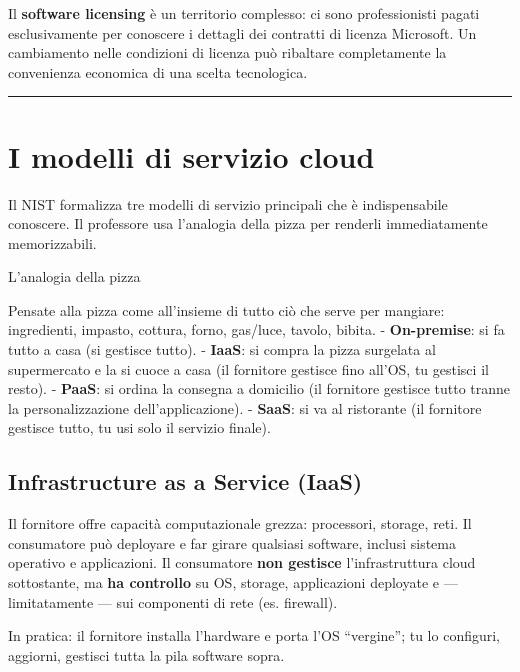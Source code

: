 \documentclass[
  italian,
  openany]{book}
\begin{document}
Il \textbf{software licensing} è un territorio complesso: ci sono
professionisti pagati esclusivamente per conoscere i dettagli dei
contratti di licenza Microsoft. Un cambiamento nelle condizioni di
licenza può ribaltare completamente la convenienza economica di una
scelta tecnologica.

\begin{center}\rule{0.5\linewidth}{0.5pt}\end{center}

\section{I modelli di servizio cloud}\label{i-modelli-di-servizio-cloud}

Il NIST formalizza tre modelli di servizio principali che è
indispensabile conoscere. Il professore usa l'analogia della pizza per
renderli immediatamente memorizzabili.

\begin{callouttip}{L’analogia della pizza}

Pensate alla pizza come all'insieme di tutto ciò che serve per mangiare:
ingredienti, impasto, cottura, forno, gas/luce, tavolo, bibita. -
\textbf{On-premise}: si fa tutto a casa (si gestisce tutto). -
\textbf{IaaS}: si compra la pizza surgelata al supermercato e la si
cuoce a casa (il fornitore gestisce fino all'OS, tu gestisci il resto).
- \textbf{PaaS}: si ordina la consegna a domicilio (il fornitore
gestisce tutto tranne la personalizzazione dell'applicazione). -
\textbf{SaaS}: si va al ristorante (il fornitore gestisce tutto, tu usi
solo il servizio finale).

\end{callouttip}

\subsection{Infrastructure as a Service
(IaaS)}\label{infrastructure-as-a-service-iaas}

Il fornitore offre capacità computazionale grezza: processori, storage,
reti. Il consumatore può deployare e far girare qualsiasi software,
inclusi sistema operativo e applicazioni. Il consumatore \textbf{non
gestisce} l'infrastruttura cloud sottostante, ma \textbf{ha controllo}
su OS, storage, applicazioni deployate e --- limitatamente --- sui
componenti di rete (es. firewall).

In pratica: il fornitore installa l'hardware e porta l'OS ``vergine'';
tu lo configuri, aggiorni, gestisci tutta la pila software sopra.
\end{document}
